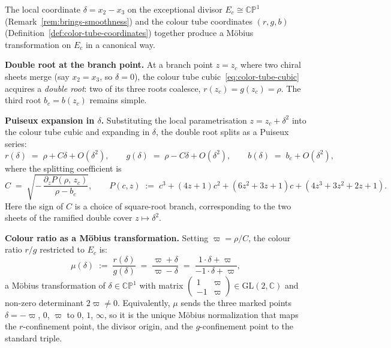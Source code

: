 \begin{remark}
\label{rem:mobius-delta-color}
The local coordinate $\delta = x_2 - x_3$ on the exceptional divisor
$E_c \cong \mathbb{CP}^1$ (Remark~\ref{rem:brings-smoothness}) and
the colour tube coordinates $(r, g, b)$
(Definition~\ref{def:color-tube-coordinates}) together produce a
M\"obius transformation on $E_c$ in a canonical way.

\medskip
\noindent\textbf{Double root at the branch point.}\;
At a branch point $z = z_c$ where two chiral sheets merge (say $x_2 = x_3$,
so $\delta = 0$), the colour tube cubic~\eqref{eq:color-tube-cubic}
acquires a \emph{double root}: two of its three roots coalesce,
$r(z_c) = g(z_c) = \rho$.  The third root $b_c = b(z_c)$ remains
simple.

\medskip
\noindent\textbf{Puiseux expansion in $\delta$.}\;
Substituting the local parametrisation $z = z_c + \delta^2$ into the
colour tube cubic and expanding in $\delta$, the double root splits as
a Puiseux series:
\begin{equation}\label{eq:color-puiseux}
  r(\delta) \;=\; \rho + C\delta + O(\delta^2),
  \qquad
  g(\delta) \;=\; \rho - C\delta + O(\delta^2),
  \qquad
  b(\delta) \;=\; b_c + O(\delta^2),
\end{equation}
where the splitting coefficient is
\begin{equation}\label{eq:splitting-coeff}
  C \;=\; \sqrt{-\,\frac{\partial_z P(\rho,\,z_c)}{\rho - b_c}},
  \qquad
  P(c,z) \;:=\; c^3+(4z+1)c^2+(6z^2+3z+1)c+(4z^3+3z^2+2z+1).
\end{equation}
Here the sign of $C$ is a choice of square-root branch, corresponding
to the two sheets of the ramified double cover $z \mapsto \delta^2$.

\medskip
\noindent\textbf{Colour ratio as a M\"obius transformation.}\;
Setting $\varpi = \rho / C$, the colour ratio $r/g$ restricted to
$E_c$ is:
\begin{equation}\label{eq:color-ratio-mobius}
  \mu(\delta) \;:=\; \frac{r(\delta)}{g(\delta)}
  \;=\; \frac{\varpi + \delta}{\varpi - \delta}
  \;=\; \frac{1 \cdot \delta + \varpi}{-1 \cdot \delta + \varpi},
\end{equation}
a M\"obius transformation of $\delta \in \mathbb{CP}^1$ with matrix
$\begin{pmatrix}1 & \varpi \\ -1 & \varpi\end{pmatrix} \in \mathrm{GL}(2,\mathbb{C})$
and non-zero determinant $2\varpi \neq 0$.  Equivalently, $\mu$ sends
the three marked points $\delta = -\varpi$, $0$, $\varpi$ to $0$,
$1$, $\infty$, so it is the unique M\"obius normalization that maps
the $r$-confinement point, the divisor origin, and the $g$-confinement
point to the standard triple.


\end{remark}
